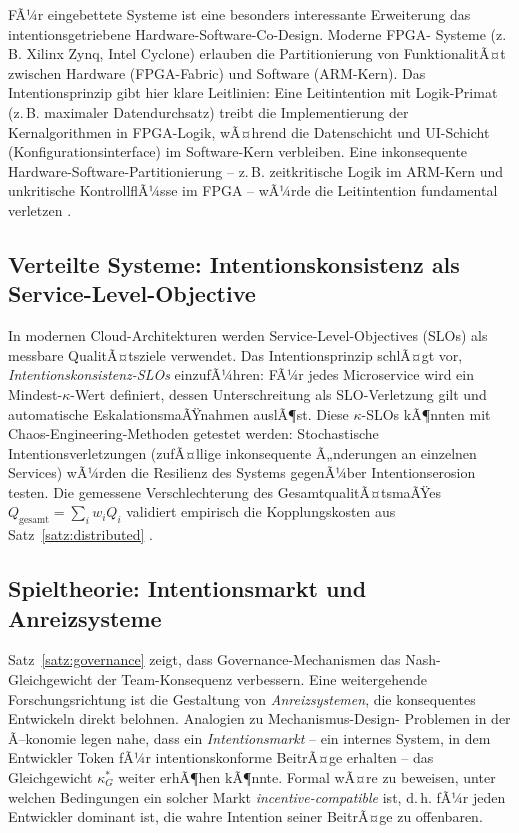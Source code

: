 ﻿\documentclass[a4paper,12pt]{article}
\theoremstyle{definition}
\begin{document}
FÃ¼r eingebettete Systeme ist eine besonders interessante Erweiterung
das intentionsgetriebene Hardware-Software-Co-Design. Moderne FPGA-
Systeme (z.\,B. Xilinx Zynq, Intel Cyclone) erlauben die Partitionierung
von FunktionalitÃ¤t zwischen Hardware (FPGA-Fabric) und Software (ARM-Kern).
Das Intentionsprinzip gibt hier klare Leitlinien: Eine Leitintention
mit Logik-Primat (z.\,B. \glqq{}maximaler Datendurchsatz\grqq{}) treibt die
Implementierung der Kernalgorithmen in FPGA-Logik, wÃ¤hrend die
Datenschicht und UI-Schicht (Konfigurationsinterface) im Software-Kern
verbleiben. Eine inkonsequente Hardware-Software-Partitionierung --
z.\,B. zeitkritische Logik im ARM-Kern und unkritische KontrollflÃ¼sse
im FPGA -- wÃ¼rde die Leitintention fundamental verletzen
\cite{epp2026subgraph}.

\subsection{Verteilte Systeme: Intentionskonsistenz als Service-Level-Objective}

In modernen Cloud-Architekturen werden Service-Level-Objectives (SLOs)
als messbare QualitÃ¤tsziele verwendet. Das Intentionsprinzip schlÃ¤gt
vor, \emph{Intentionskonsistenz-SLOs} einzufÃ¼hren: FÃ¼r jedes Microservice
wird ein Mindest-$\kappa$-Wert definiert, dessen Unterschreitung als
SLO-Verletzung gilt und automatische EskalationsmaÃŸnahmen auslÃ¶st.
Diese $\kappa$-SLOs kÃ¶nnten mit Chaos-Engineering-Methoden getestet
werden: Stochastische Intentionsverletzungen (zufÃ¤llige inkonsequente
Ã„nderungen an einzelnen Services) wÃ¼rden die Resilienz des Systems
gegenÃ¼ber Intentionserosion testen. Die gemessene Verschlechterung
des GesamtqualitÃ¤tsmaÃŸes $Q_{\text{gesamt}} = \sum_{i} w_i Q_i$
validiert empirisch die Kopplungskosten aus Satz~\ref{satz:distributed}
\cite{brewer2000cap}.

\subsection{Spieltheorie: Intentionsmarkt und Anreizsysteme}

Satz~\ref{satz:governance} zeigt, dass Governance-Mechanismen das
Nash-Gleichgewicht der Team-Konsequenz verbessern. Eine weitergehende
Forschungsrichtung ist die Gestaltung von \emph{Anreizsystemen}, die
konsequentes Entwickeln direkt belohnen. Analogien zu Mechanismus-Design-
Problemen in der Ã–konomie \cite{osborne1994gametheory} legen nahe, dass
ein \emph{Intentionsmarkt} -- ein internes System, in dem Entwickler
Token fÃ¼r intentionskonforme BeitrÃ¤ge erhalten -- das Gleichgewicht
$\kappa^*_G$ weiter erhÃ¶hen kÃ¶nnte. Formal wÃ¤re zu beweisen, unter
welchen Bedingungen ein solcher Markt \emph{incentive-compatible}
ist, d.\,h. fÃ¼r jeden Entwickler dominant ist, die wahre Intention
seiner BeitrÃ¤ge zu offenbaren.
\end{document}
